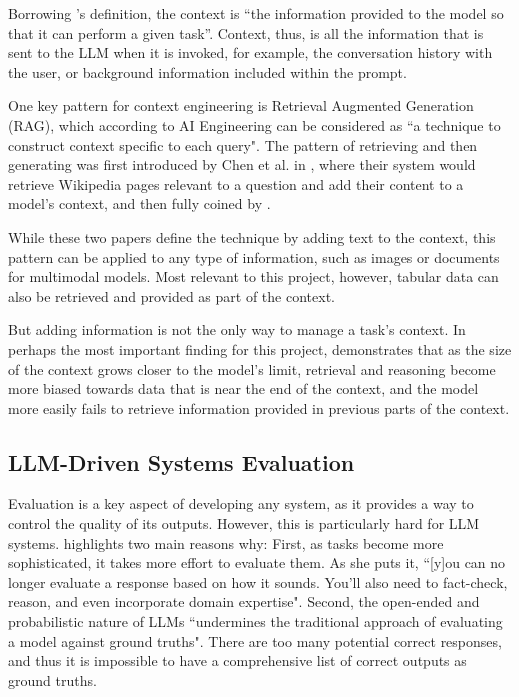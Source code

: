 \documentclass[a4paper]{report}
\begin{document}
Borrowing \cite{aiebook2025}'s definition, the context is ``the information provided to the model so that it can perform a given task''. Context, thus, is all the information that is sent to the LLM when it is invoked, for example, the conversation history with the user, or background information included within the prompt.

One key pattern for context engineering is Retrieval Augmented Generation (RAG), which according to AI Engineering can be considered as ``a technique to construct context specific to each query". The pattern of retrieving and then generating was first introduced by Chen et al. in \cite{chen2017readingwikipediaansweropendomain}, where their system would retrieve Wikipedia pages relevant to a question and add their content to a model's context, and then fully coined by \cite{lewis2021retrievalaugmentedgeneration}.

While these two papers define the technique by adding text to the context, this pattern can be applied to any type of information, such as images or documents for multimodal models. Most relevant to this project, however, tabular data can also be retrieved and provided as part of the context.

But adding information is not the only way to manage a task's context. In perhaps the most important finding for this project, \cite{veseli2025positionalbiasesshiftinputs} demonstrates that as the size of the context grows closer to the model's limit, retrieval and reasoning become more biased towards data that is near the end of the context, and the model more easily fails to retrieve information provided in previous parts of the context.

\subsection{LLM-Driven Systems Evaluation}
\label{sec:llm-evaluation}

Evaluation is a key aspect of developing any system, as it provides a way to control the quality of its outputs. However, this is particularly hard for LLM systems. \cite{aiebook2025} highlights two main reasons why: First, as tasks become more sophisticated, it takes more effort to evaluate them. As she puts it, ``[y]ou can no longer evaluate a response based on how it sounds. You'll also need to fact-check, reason, and even incorporate domain expertise". Second, the open-ended and probabilistic nature of LLMs ``undermines the traditional approach of evaluating a model against ground truths". There are too many potential correct responses, and thus it is impossible to have a comprehensive list of correct outputs as ground truths.
\end{document}
